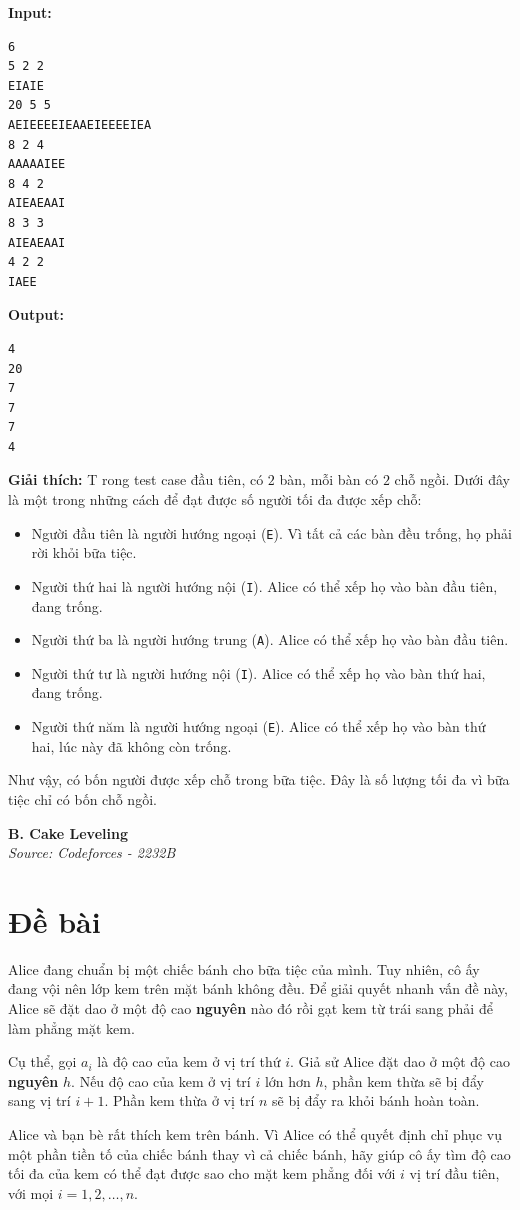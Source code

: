\documentclass[11pt]{article}
\newcommand{\problem}[2]{
    \begin{problembox}
    \begin{center}
        \Large \textbf{#1} \\
        \vspace{0.2cm}
        \small \textit{Source: #2}
    \end{center}
    \end{problembox}
}
\newcommand{\explanation}[1]{
    \vspace{0.5cm}
    \noindent \textbf{Giải thích:} #1
}
\begin{document}
\example
\textbf{Input:}
\begin{lstlisting}
6
5 2 2
EIAIE
20 5 5
AEIEEEEIEAAEIEEEEIEA
8 2 4
AAAAAIEE
8 4 2
AIEAEAAI
8 3 3
AIEAEAAI
4 2 2
IAEE
\end{lstlisting}

\textbf{Output:}
\begin{lstlisting}
4
20
7
7
7
4
\end{lstlisting}

\explanation
Trong test case đầu tiên, có $2$ bàn, mỗi bàn có $2$ chỗ ngồi. Dưới đây là một trong những cách để đạt được số người tối đa được xếp chỗ:

\begin{itemize}
    \item Người đầu tiên là người hướng ngoại (\texttt{E}). Vì tất cả các bàn đều trống, họ phải rời khỏi bữa tiệc.
    \item Người thứ hai là người hướng nội (\texttt{I}). Alice có thể xếp họ vào bàn đầu tiên, đang trống.
    \item Người thứ ba là người hướng trung (\texttt{A}). Alice có thể xếp họ vào bàn đầu tiên.
    \item Người thứ tư là người hướng nội (\texttt{I}). Alice có thể xếp họ vào bàn thứ hai, đang trống.
    \item Người thứ năm là người hướng ngoại (\texttt{E}). Alice có thể xếp họ vào bàn thứ hai, lúc này đã không còn trống.
\end{itemize}

Như vậy, có bốn người được xếp chỗ trong bữa tiệc. Đây là số lượng tối đa vì bữa tiệc chỉ có bốn chỗ ngồi.

\newpage
\problem{B. Cake Leveling}{Codeforces - 2232B}

\section*{Đề bài}
Alice đang chuẩn bị một chiếc bánh cho bữa tiệc của mình. Tuy nhiên, cô ấy đang vội nên lớp kem trên mặt bánh không đều. Để giải quyết nhanh vấn đề này, Alice sẽ đặt dao ở một độ cao \textbf{nguyên} nào đó rồi gạt kem từ trái sang phải để làm phẳng mặt kem.

Cụ thể, gọi $a_i$ là độ cao của kem ở vị trí thứ $i$. Giả sử Alice đặt dao ở một độ cao \textbf{nguyên} $h$. Nếu độ cao của kem ở vị trí $i$ lớn hơn $h$, phần kem thừa sẽ bị đẩy sang vị trí $i+1$. Phần kem thừa ở vị trí $n$ sẽ bị đẩy ra khỏi bánh hoàn toàn.

Alice và bạn bè rất thích kem trên bánh. Vì Alice có thể quyết định chỉ phục vụ một phần tiền tố của chiếc bánh thay vì cả chiếc bánh, hãy giúp cô ấy tìm độ cao tối đa của kem có thể đạt được sao cho mặt kem phẳng đối với $i$ vị trí đầu tiên, với mọi $i = 1, 2, \ldots, n$.
\end{document}
